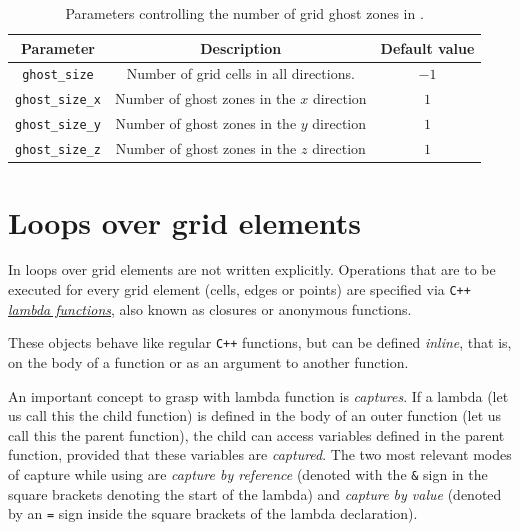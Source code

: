 \begin{table}[ht]
  \centering
  \begin{tabular}{ccc}
  Parameter             & Description                                & Default value \\\hline\hline
  \texttt{ghost\_size}    & Number of grid cells in all directions.    & $-1$          \\
  \texttt{ghost\_size\_x} & Number of ghost zones in the $x$ direction & $1$           \\
  \texttt{ghost\_size\_y} & Number of ghost zones in the $y$ direction & $1$           \\
  \texttt{ghost\_size\_z} & Number of ghost zones in the $z$ direction & $1$           \\\hline\hline
  \end{tabular}
  \caption{Parameters controlling the number of grid ghost zones in \CarpetX.}
  \label{tab:ghost_sizes}
\end{table}

\section{Loops over grid elements}
\label{sec:loops}

In \CarpetX\space loops over grid elements are not written explicitly. Operations that are to be executed for every grid element (cells, edges or points) are specified via \texttt{C++} \href{https://en.cppreference.com/w/cpp/language/lambda}{\textit{lambda functions}}, also known as closures or anonymous functions.

These objects behave like regular \texttt{C++} functions, but can be defined \textit{inline}, that is, on the body of a function or as an argument to another function.

An important concept to grasp with lambda function is \textit{captures}. If a lambda (let us call this the child function) is defined in the body of an outer function (let us call this the parent function), the child can access variables defined in the parent function, provided that these variables are \textit{captured}. The two most relevant modes of capture while using \CarpetX\space are \textit{capture by reference} (denoted with the \texttt{\&} sign in the square brackets denoting the start of the lambda) and \textit{capture by value} (denoted by an \texttt{=} sign inside the square brackets of the lambda declaration).

